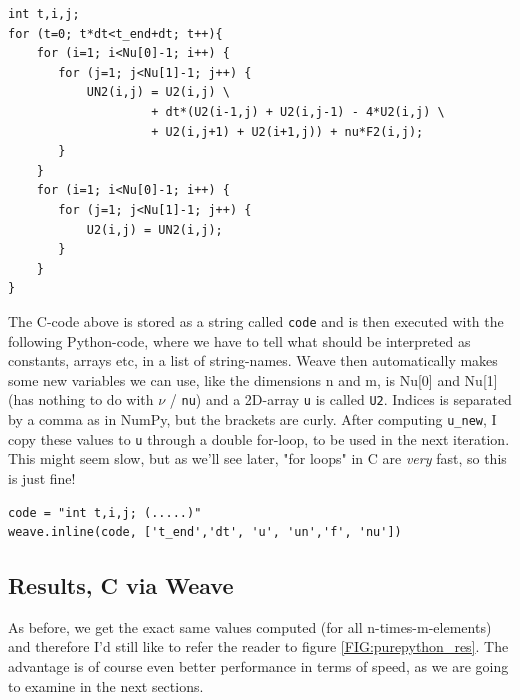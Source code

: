 \documentclass[a4paper]{article}
\begin{document}
\begin{verbatim}
int t,i,j;
for (t=0; t*dt<t_end+dt; t++){
    for (i=1; i<Nu[0]-1; i++) {
       for (j=1; j<Nu[1]-1; j++) {
           UN2(i,j) = U2(i,j) \
                    + dt*(U2(i-1,j) + U2(i,j-1) - 4*U2(i,j) \
                    + U2(i,j+1) + U2(i+1,j)) + nu*F2(i,j);
       }
    }
    for (i=1; i<Nu[0]-1; i++) {
       for (j=1; j<Nu[1]-1; j++) {
           U2(i,j) = UN2(i,j);
       }
    }
}
\end{verbatim}

The C-code above is stored as a string called \texttt{code} and is then executed with the following Python-code, where we have to tell what should be interpreted as constants, arrays etc, in a list of string-names. Weave then automatically makes some new variables we can use, like the dimensions n and m, is Nu[0] and Nu[1] (has nothing to do with $\nu$ / \texttt{nu}) and a 2D-array \texttt{u} is called \texttt{U2}. Indices is separated by a comma as in NumPy, but the brackets are curly. After computing \texttt{u\_new}, I copy these values to \texttt{u} through a double for-loop, to be used in the next iteration. This might seem slow, but as we'll see later, "for loops" in C are \textit{very} fast, so this is just fine!
\newline

\begin{verbatim}
code = "int t,i,j; (.....)"
weave.inline(code, ['t_end','dt', 'u', 'un','f', 'nu'])
\end{verbatim}

\subsection*{Results, C via Weave}
As before, we get the exact same values computed (for all n-times-m-elements) and therefore I'd still like to refer the reader to figure \ref{FIG:purepython_res}. The advantage is of course even better performance in terms of speed, as we are going to examine in the next sections.
\end{document}

